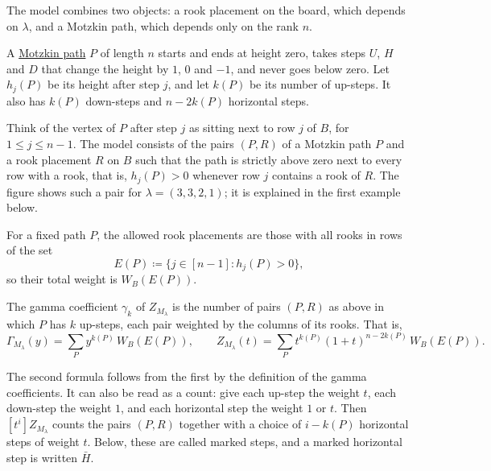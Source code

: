The model combines two objects: a rook placement on the board, which depends on
$\lambda$, and a Motzkin path, which depends only on the rank $n$.

A \hyperref[motzkinPolynomialsRealRooted]{Motzkin path} $P$ of length $n$
starts and ends at height zero, takes steps $U$, $H$ and $D$ that change the
height by $1$, $0$ and $-1$, and never goes below zero.  Let $h_j(P)$ be its
height after step $j$, and let $k(P)$ be its number of up-steps.  It also has
$k(P)$ down-steps and $n-2k(P)$ horizontal steps.

Think of the vertex of $P$ after step $j$ as sitting next to row $j$ of
$B$, for $1\leq j\leq n-1$.  The model consists of the pairs $(P,R)$ of a
Motzkin path $P$ and a rook placement $R$ on $B$ such that the path is
strictly above zero next to every row with a rook, that is, $h_j(P)>0$
whenever row $j$ contains a rook of $R$.  The figure shows such a pair for $\lambda=(3,3,2,1)$;
it is explained in the first example below.
\begin{figure}
\end{figure}

For a fixed path $P$, the allowed rook placements are those with all rooks
in rows of the set
\[
  E(P)\coloneqq\{j\in[n-1]: h_j(P)>0\},
\]
so their total weight is $W_B(E(P))$.

\begin{theorem}[Alexandersson, 2026]\label{schubertMatroidZRookMotzkin}
The gamma coefficient $\gamma_k$ of $Z_{M_\lambda}$ is the number of pairs
$(P,R)$ as above in which $P$ has $k$ up-steps, each pair weighted by the
columns of its rooks.  That is,
\[
  \Gamma_{M_\lambda}(y)=\sum_{P} y^{k(P)}\,W_B(E(P)),
  \qquad
  Z_{M_\lambda}(t)=\sum_{P} t^{k(P)}(1+t)^{n-2k(P)}\,W_B(E(P)).
\]
\end{theorem}

The second formula follows from the first by the definition of the gamma
coefficients.  It can also be read as a count: give each up-step the weight
$t$, each down-step the weight $1$, and each horizontal step the weight $1$ or
$t$.  Then $[t^i]Z_{M_\lambda}$ counts the pairs $(P,R)$ together with a
choice of $i-k(P)$ horizontal steps of weight $t$.  Below, these are called
marked steps, and a marked horizontal step is written $\bar{H}$.

